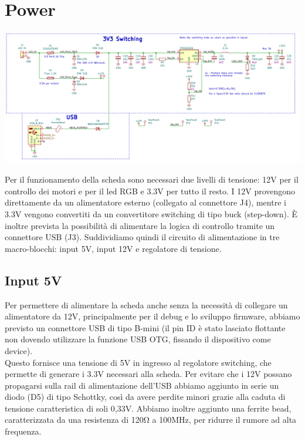 \hypertarget{power}{%
\section{Power}\label{power}}

\begin{center}
\includegraphics[scale=0.45]{figures/image65.png}
\captionsetup{type=figure}
\end{center}

\noindent Per il funzionamento della scheda sono necessari due livelli di tensione: 
12V per il controllo dei motori e per il led RGB e 3.3V per tutto il resto. 
I 12V provengono direttamente da un alimentatore esterno (collegato al connettore J4), 
mentre i 3.3V vengono convertiti da un convertitore switching di tipo buck (step-down). 
È inoltre prevista la possibilità di alimentare la logica di controllo tramite un connettore USB (J3). 
Suddividiamo quindi il circuito di alimentazione in tre macro-blocchi: input 5V, input 12V e regolatore di tensione.

\hypertarget{input-5V}{
\subsection{\texorpdfstring{Input 5V}{Input 5V}}\label{input-5V}}

Per permettere di alimentare la scheda anche senza la necessità di collegare un 
alimentatore da 12V, principalmente per il debug e lo sviluppo firmware, abbiamo 
previsto un connettore USB di tipo B-mini (il pin ID è stato lasciato flottante non 
dovendo utilizzare la funzione USB OTG, fissando il dispositivo come device).\\
Questo fornisce una tensione di 5V in ingresso al regolatore switching, che permette di generare i 3.3V 
necessari alla scheda. Per evitare che i 12V possano propagarsi sulla rail di alimentazione dell’USB abbiamo 
aggiunto in serie un diodo (D5) di tipo Schottky, così da avere perdite minori grazie alla caduta di tensione 
caratteristica di soli 0,33V.
Abbiamo inoltre aggiunto una ferrite bead, caratterizzata da una resistenza di 120Ω a 100MHz, per
ridurre il rumore ad alta frequenza.

